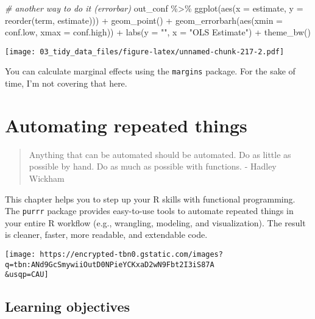 \documentclass[
]{book}
\newenvironment{Shaded}{\begin{snugshade}}{\end{snugshade}}
\newcommand{\AttributeTok}[1]{\textcolor[rgb]{0.77,0.63,0.00}{#1}}
\newcommand{\CommentTok}[1]{\textcolor[rgb]{0.56,0.35,0.01}{\textit{#1}}}
\newcommand{\FunctionTok}[1]{\textcolor[rgb]{0.00,0.00,0.00}{#1}}
\newcommand{\NormalTok}[1]{#1}
\newcommand{\SpecialCharTok}[1]{\textcolor[rgb]{0.00,0.00,0.00}{#1}}
\newcommand{\StringTok}[1]{\textcolor[rgb]{0.31,0.60,0.02}{#1}}
\begin{document}
\begin{Shaded}
\begin{Highlighting}[]
\CommentTok{\# another way to do it (errorbar)}
\NormalTok{out\_conf }\SpecialCharTok{\%\textgreater{}\%}
  \FunctionTok{ggplot}\NormalTok{(}\FunctionTok{aes}\NormalTok{(}\AttributeTok{x =}\NormalTok{ estimate, }\AttributeTok{y =} \FunctionTok{reorder}\NormalTok{(term, estimate))) }\SpecialCharTok{+}
  \FunctionTok{geom\_point}\NormalTok{() }\SpecialCharTok{+}
  \FunctionTok{geom\_errorbarh}\NormalTok{(}\FunctionTok{aes}\NormalTok{(}\AttributeTok{xmin =}\NormalTok{ conf.low, }\AttributeTok{xmax =}\NormalTok{ conf.high)) }\SpecialCharTok{+}
  \FunctionTok{labs}\NormalTok{(}\AttributeTok{y =} \StringTok{""}\NormalTok{, }\AttributeTok{x =} \StringTok{"OLS Estimate"}\NormalTok{) }\SpecialCharTok{+}
  \FunctionTok{theme\_bw}\NormalTok{()}
\end{Highlighting}
\end{Shaded}

\texttt{[image: 03\_tidy\_data\_files/figure-latex/unnamed-chunk-217-2.pdf]}

You can calculate marginal effects using the \texttt{margins} package. For the sake of time, I'm not covering that here.

\hypertarget{functional_programming}{%
\chapter{Automating repeated things}\label{functional_programming}}

\begin{quote}
Anything that can be automated should be automated. Do as little as possible by hand. Do as much as possible with functions.
- Hadley Wickham
\end{quote}

This chapter helps you to step up your R skills with functional programming. The \texttt{purrr} package provides easy-to-use tools to automate repeated things in your entire R workflow (e.g., wrangling, modeling, and visualization). The result is cleaner, faster, more readable, and extendable code.

\texttt{[image: https://encrypted-tbn0.gstatic.com/images?q=tbn:ANd9GcSmywiiOutD0NPieYCKxaD2wN9Fbt2I3iS87A\\\&usqp=CAU]}

\hypertarget{learning-objectives}{%
\section{Learning objectives}\label{learning-objectives}}
\end{document}
